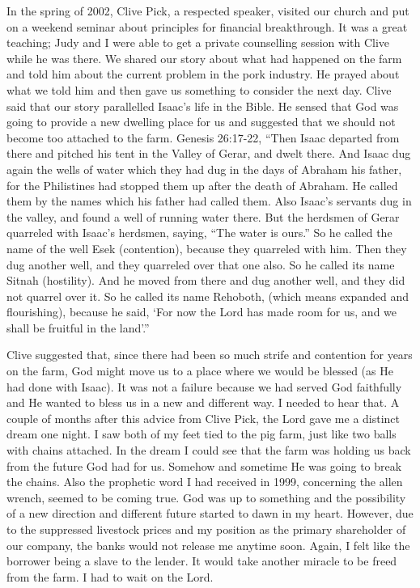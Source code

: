 \documentclass[oneside]{book}
\begin{document}
In the spring of 2002, Clive Pick, a respected speaker, visited our church and  put on a weekend seminar about principles for financial breakthrough. It was a great teaching; Judy and I were able to get a private counselling session with Clive while he was there. We shared our story about what had happened on the farm and told him about the current problem in the pork industry. He prayed about what we told him and then gave us something to consider the next day. Clive said that our story parallelled Isaac's life in the Bible. He sensed that God was going to provide a new dwelling place for us and suggested that we should not become too attached to the farm. Genesis 26:17-22, “Then Isaac departed from there and pitched his tent in the Valley of Gerar, and dwelt there. And Isaac dug again the wells of water which they had dug in the days of Abraham his father, for the Philistines had stopped them up after the death of Abraham. He called them by the names which his father had called them. Also Isaac’s servants dug in the valley, and found a well of running water there. But the herdsmen of Gerar quarreled with Isaac’s herdsmen, saying, “The water is ours.” So he called the name of the well Esek (contention), because they quarreled with him. Then they dug another well, and they quarreled over that one also. So he called its name Sitnah (hostility). And he moved from there and dug another well, and they did not quarrel over it. So he called its name Rehoboth, (which means expanded and flourishing), because he said, ‘For now the Lord has made room for us, and we shall be fruitful in the land’.”

Clive suggested that, since there had been so much strife and contention for years on the farm, God might move us to a place where we would be blessed (as He had done with Isaac). It was not a failure because we had served God faithfully and He wanted to bless us in a new and different way. I needed to hear that. A couple of months after this advice from Clive Pick, the Lord gave me a distinct dream one night. I saw both of my feet tied to the pig farm, just like two balls with chains attached. In the dream I could see that the farm was holding us back from the future God had for us. Somehow and sometime He was going to break the chains. Also the prophetic word I had received in 1999, concerning the allen wrench, seemed to be coming true. God was up to something and the possibility of a new direction and different future started to dawn in my heart. However, due to the suppressed livestock prices and my position as the primary shareholder of our company, the banks would not release me anytime soon. Again, I felt like the borrower being a slave to the lender. It would take another miracle to be freed from the farm. I had to wait on the Lord.
\end{document}
